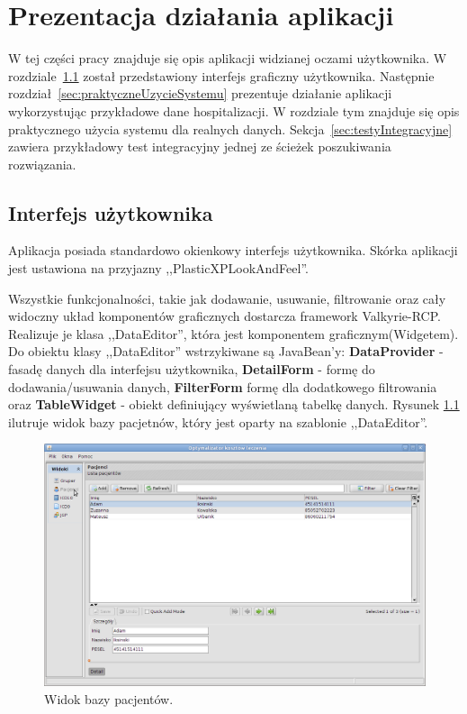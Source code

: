 \chapter{Prezentacja działania aplikacji}
\label{cha:prezentacja}

W tej części pracy znajduje się opis aplikacji widzianej oczami użytkownika. W rozdziale~\ref{sec:interfejsUzytkownika} został
przedstawiony interfejs graficzny użytkownika. Następnie rozdział~\ref{sec:praktyczneUzycieSystemu} prezentuje działanie aplikacji wykorzystując przykładowe dane hospitalizacji. W rozdziale tym znajduje się opis praktycznego użycia systemu dla realnych danych. Sekcja~\ref{sec:testyIntegracyjne} zawiera przykładowy test integracyjny jednej ze ścieżek poszukiwania rozwiązania.


\section{Interfejs użytkownika}
\label{sec:interfejsUzytkownika}
Aplikacja posiada standardowo okienkowy interfejs użytkownika. Skórka aplikacji jest ustawiona na przyjazny ,,PlasticXPLookAndFeel''.

Wszystkie funkcjonalności, takie jak dodawanie, usuwanie, filtrowanie oraz cały widoczny układ komponentów graficznych dostarcza framework Valkyrie-RCP. Realizuje je klasa ,,DataEditor'', która jest komponentem graficznym(Widgetem). Do obiektu klasy ,,DataEditor'' wstrzykiwane są JavaBean'y: \textbf{DataProvider} - fasadę danych dla interfejsu użytkownika, \textbf{DetailForm} - formę do dodawania/usuwania danych, \textbf{FilterForm} formę dla dodatkowego filtrowania oraz \textbf{TableWidget} - obiekt definiujący wyświetlaną tabelkę danych\cite{valkyrie_reference}.
Rysunek \ref{img:patient} ilutruje widok bazy pacjetnów, który jest oparty na szablonie ,,DataEditor''.

\begin{figure}[!ht]
\centering
\includegraphics[scale=0.4]{images/patient} 
\caption[Widok bazy pacjentów]{Widok bazy pacjentów.}
\label{img:patient}
\end{figure}

